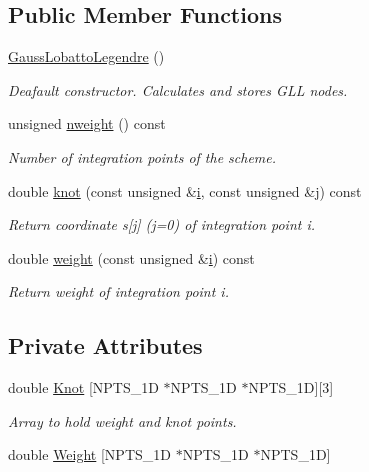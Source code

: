 \subsection*{Public Member Functions}
\begin{DoxyCompactItemize}
\item 
\hyperlink{classoomph_1_1GaussLobattoLegendre_3_013_00_01NPTS__1D_01_4_a4e9d5640c195c310cd0255a20137c627}{Gauss\+Lobatto\+Legendre} ()
\begin{DoxyCompactList}\small\item\em Deafault constructor. Calculates and stores G\+LL nodes. \end{DoxyCompactList}\item 
unsigned \hyperlink{classoomph_1_1GaussLobattoLegendre_3_013_00_01NPTS__1D_01_4_acdc8776b03b2308a687f800e6c1026bc}{nweight} () const
\begin{DoxyCompactList}\small\item\em Number of integration points of the scheme. \end{DoxyCompactList}\item 
double \hyperlink{classoomph_1_1GaussLobattoLegendre_3_013_00_01NPTS__1D_01_4_a87943de05b72f4fc59080ef0d16ad7f7}{knot} (const unsigned \&\hyperlink{cfortran_8h_adb50e893b86b3e55e751a42eab3cba82}{i}, const unsigned \&j) const
\begin{DoxyCompactList}\small\item\em Return coordinate s\mbox{[}j\mbox{]} (j=0) of integration point i. \end{DoxyCompactList}\item 
double \hyperlink{classoomph_1_1GaussLobattoLegendre_3_013_00_01NPTS__1D_01_4_a17845541ab33f080d323a445f189e095}{weight} (const unsigned \&\hyperlink{cfortran_8h_adb50e893b86b3e55e751a42eab3cba82}{i}) const
\begin{DoxyCompactList}\small\item\em Return weight of integration point i. \end{DoxyCompactList}\end{DoxyCompactItemize}
\subsection*{Private Attributes}
\begin{DoxyCompactItemize}
\item 
double \hyperlink{classoomph_1_1GaussLobattoLegendre_3_013_00_01NPTS__1D_01_4_a38a46dec0db6d553cdf9dc7c3684661e}{Knot} \mbox{[}N\+P\+T\+S\+\_\+1D $\ast$N\+P\+T\+S\+\_\+1D $\ast$N\+P\+T\+S\+\_\+1D\mbox{]}\mbox{[}3\mbox{]}
\begin{DoxyCompactList}\small\item\em Array to hold weight and knot points. \end{DoxyCompactList}\item 
double \hyperlink{classoomph_1_1GaussLobattoLegendre_3_013_00_01NPTS__1D_01_4_a76673329c738e81bb440af2a59b3f922}{Weight} \mbox{[}N\+P\+T\+S\+\_\+1D $\ast$N\+P\+T\+S\+\_\+1D $\ast$N\+P\+T\+S\+\_\+1D\mbox{]}
\end{DoxyCompactItemize}
